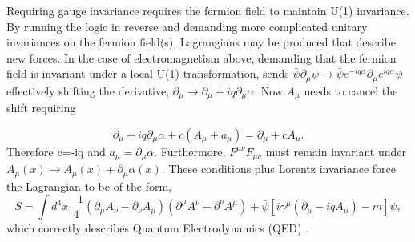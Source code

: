 \documentclass[12pt]{article}
\begin{document}
Requiring gauge invariance requires the fermion field to maintain U(1) invariance. By running the logic in reverse and demanding more complicated unitary invariances on the fermion field(s), Lagrangians may be produced that describe new forces. In the case of electromagnetism above, demanding that the fermion field is invariant under a local U(1) transformation, sends $\bar{\psi}\partial_\mu\psi \rightarrow \bar{\psi} e^{-iq\alpha} \partial_\mu e^{iq\alpha} \psi$ effectively shifting the derivative, $\partial_\mu \rightarrow \partial_\mu + iq\partial_\mu\alpha$. Now $A_\mu$ needs to cancel the shift requiring 

\begin{equation}
\partial_\mu + iq\partial_\mu\alpha + c(A_\mu + a_\mu) = \partial_\mu + cA_\mu. 
\end{equation}
Therefore c=-iq and $a_\mu = \partial_\mu\alpha$. Furthermore, $F^{\mu\nu}F_{\mu\nu}$ must remain invariant under $A_\mu(x) \rightarrow A_\mu(x) + \partial_\mu\alpha(x)$. These conditions plus Lorentz invariance force the Lagrangian to be of the form, 
\begin{equation}
S = \int d^4x \frac{-1}{4}(\partial_\mu A_\nu - \partial_\nu A_\mu)(\partial^\mu A^\nu - \partial^\nu A^\mu) + \bar{\psi}\left[i\gamma^\mu\left(\partial_\mu - iqA_\mu\right) - m \right]\psi, 
\end{equation}
which correctly describes Quantum Electrodynamics (QED) \cite{zee}.
\end{document}
